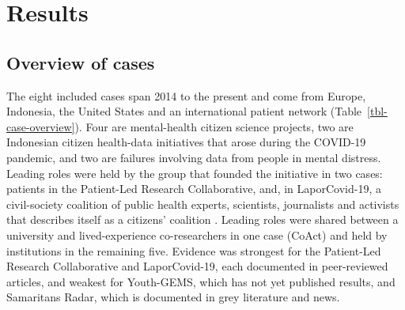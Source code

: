 \documentclass[
  number,
  preprint]{elsarticle}
\begin{document}
\section{Results}\label{sec-results}

\subsection{Overview of cases}\label{overview-of-cases}

The eight included cases span 2014 to the present and come from Europe,
Indonesia, the United States and an international patient network
(Table~\ref{tbl-case-overview}). Four are mental-health citizen science
projects, two are Indonesian citizen health-data initiatives that arose
during the COVID-19 pandemic, and two are failures involving data from
people in mental distress. Leading roles were held by the group that
founded the initiative in two cases: patients in the Patient-Led
Research Collaborative, and, in LaporCovid-19, a civil-society coalition
of public health experts, scientists, journalists and activists that
describes itself as a citizens' coalition
\citep{ekawati2022, laporcovid2021}. Leading roles were shared between a
university and lived-experience co-researchers in one case (CoAct) and
held by institutions in the remaining five. Evidence was strongest for
the Patient-Led Research Collaborative and LaporCovid-19, each
documented in peer-reviewed articles, and weakest for Youth-GEMS, which
has not yet published results, and Samaritans Radar, which is documented
in grey literature and news.
\end{document}
